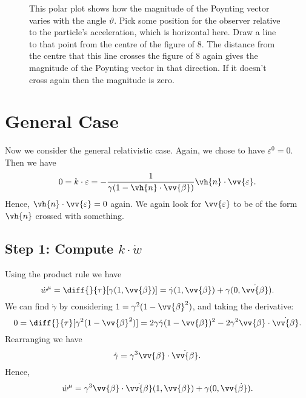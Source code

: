 \documentclass[fleqn]{NotesClass}
\begin{document}
    \begin{figure}
        \caption[Polar plot of non-relativistic Poynting vector.]{This polar plot shows how the magnitude of the Poynting vector varies with the angle \(\vartheta\). Pick some position for the observer relative to the particle's acceleration, which is horizontal here. Draw a line to that point from the centre of the figure of 8. The distance from the centre that this line crosses the figure of 8 again gives the magnitude of the Poynting vector in that direction. If it doesn't cross again then the magnitude is zero.}
        \label{fig:poynting non-relativistic radiation polar}
    \end{figure}
    
    \section{General Case}
    Now we consider the general relativistic case.
    Again, we chose to have \(\varepsilon^0 = 0\).
    Then we have
    \begin{equation}
        0 = k \cdot \varepsilon = - \frac{1}{\gamma(1 - \vh{n} \cdot \vv{\beta})} \vh{n} \cdot \vv{\varepsilon}.
    \end{equation}
    Hence, \(\vh{n} \cdot \vv{\varepsilon} = 0\) again.
    We again look for \(\vv{\varepsilon}\) to be of the form \(\vh{n}\) crossed with something.
    
    \subsection{Step 1: Compute \texorpdfstring{\(k \cdot \dot{w}\)}{k . dw/dtau}}
    Using the product rule we have
    \begin{equation}
        \dot{w}^\mu = \diff{}{\tau} [\gamma(1, \vv{\beta})] = \dot{\gamma} (1, \vv{\beta}) + \gamma (0, \dot{\vv{\beta}}).
    \end{equation}
    We can find \(\dot{\gamma}\) by considering \(1 = \gamma^2(1 - \vv{\beta}^2)\), and taking the derivative:
    \begin{equation}
        0 = \diff{}{\tau} [\gamma^2(1 - \vv{\beta}^2)] = 2\gamma\dot{\gamma}(1 - \vv{\beta})^2 - 2\gamma^2\vv{\beta} \cdot \dot{\vv{\beta}}.
    \end{equation}
    Rearranging we have
    \begin{equation}
        \dot{\gamma} = \gamma^3 \vv{\beta} \cdot \dot{\vv{\beta}}.
    \end{equation}
    Hence,
    \begin{equation}
        \dot{w}^\mu = \gamma^3 \vv{\beta} \cdot \dot{\vv{\beta}}(1, \vv{\beta}) + \gamma(0, \vv{\dot{\beta}}).
    \end{equation}
    
\end{document}
